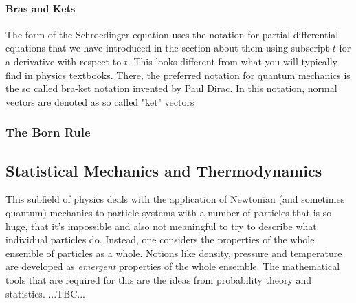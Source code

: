 \paragraph{Bras and Kets}
The form of the Schroedinger equation uses the notation for partial differential equations that we have introduced in the section about them using subscript $t$ for a derivative with respect to $t$. This looks different from what you will typically find in physics textbooks. There, the preferred notation for quantum mechanics is the so called bra-ket notation invented by Paul Dirac. In this notation, normal vectors are denoted as so called "ket" vectors



\subsubsection{The Born Rule}











\subsection{Statistical Mechanics and Thermodynamics}
This subfield of physics deals with the application of Newtonian (and sometimes quantum) mechanics to particle systems with a number of particles that is so huge, that it's impossible and also not meaningful to try to describe what individual particles do. Instead, one considers the properties of the whole ensemble of particles as a whole. Notions like density, pressure and temperature are developed as \emph{emergent} properties of the whole ensemble. The mathematical tools that are required for this are the ideas from probability theory and statistics. ...TBC...

